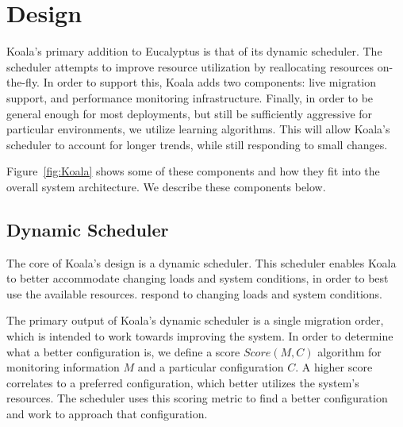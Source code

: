 \section{Design}
\label{sec:design}


Koala's primary addition to Eucalyptus is that of its dynamic scheduler.  The scheduler
attempts to improve resource utilization by reallocating resources on-the-fly.
In order to support this, Koala adds two components: live migration
support, and performance monitoring infrastructure.  Finally, in order to be general
enough for most deployments, but still be sufficiently aggressive for 
particular environments, we utilize learning algorithms.  This will allow Koala's scheduler to account for
longer trends, while still responding to small changes.

Figure~\ref{fig:Koala} shows some of these components and how they fit into the
overall system architecture.  We describe these components below.


\subsection{Dynamic Scheduler}

The core of Koala's design is a dynamic scheduler.  This
scheduler enables Koala to better accommodate changing loads and system conditions, in order to best use the available resources.
respond to changing loads and system conditions.

The primary output of Koala's dynamic scheduler is a single migration order, which is intended to work towards improving the system.  In order to determine what a
better configuration is, we define a score $Score(M,C)$ algorithm for monitoring
information $M$ and a particular configuration $C$.  A higher score correlates to a
preferred configuration, which better utilizes the system's resources.  The scheduler
uses this scoring metric to find a better configuration and work to approach that configuration.

